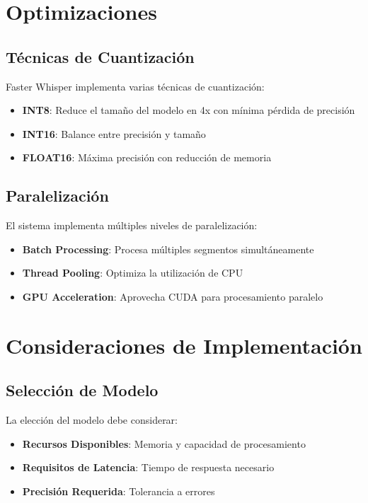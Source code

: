 \section{Optimizaciones}
\label{sec:optimizations}

\subsection{Técnicas de Cuantización}
\label{subsec:quantization}

Faster Whisper implementa varias técnicas de cuantización:

\begin{itemize}
	\item \textbf{INT8}: Reduce el tamaño del modelo en 4x con mínima pérdida de precisión
	\item \textbf{INT16}: Balance entre precisión y tamaño
	\item \textbf{FLOAT16}: Máxima precisión con reducción de memoria
\end{itemize}

\subsection{Paralelización}
\label{subsec:parallelization}

El sistema implementa múltiples niveles de paralelización:

\begin{itemize}
	\item \textbf{Batch Processing}: Procesa múltiples segmentos simultáneamente
	\item \textbf{Thread Pooling}: Optimiza la utilización de CPU
	\item \textbf{GPU Acceleration}: Aprovecha CUDA para procesamiento paralelo
\end{itemize}

\section{Consideraciones de Implementación}
\label{sec:implementation-considerations}

\subsection{Selección de Modelo}
La elección del modelo debe considerar:

\begin{itemize}
	\item \textbf{Recursos Disponibles}: Memoria y capacidad de procesamiento
	\item \textbf{Requisitos de Latencia}: Tiempo de respuesta necesario
	\item \textbf{Precisión Requerida}: Tolerancia a errores
\end{itemize}


